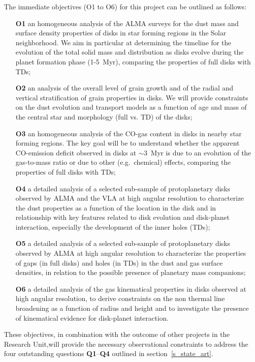 \documentclass[10pt,fleqn,twoside]{article}
\begin{document}
The immediate objectives (O1 to O6) for this project can be outlined as follows:
\begin{itemize}
\item[{\bf O1}] an homogeneous analysis of the ALMA surveys for the dust mass and surface density properties of disks in star forming regions in the Solar neighborhood. We aim in particular at determining the timeline for the evolution of the total solid mass and distribution as disks evolve during the planet formation phase (1-5~Myr), comparing the properties of full disks with TDs;
\item[{\bf O2}] an analysis of the overall level of grain growth and of the radial and vertical stratification of grain properties in disks. We will provide constraints on the dust evolution and transport models as a function of age and mass of the central star and morphology (full vs. TD) of the disks;
\item[{\bf O3}] an homogeneous analysis of the CO-gas content in disks in nearby star forming regions. The key goal will be to understand whether the apparent CO-emission deficit observed in disks at $\sim$3~Myr is due to an evolution of the gas-to-mass ratio or due to other (e.g.\ chemical) effects, comparing the properties of full disks with TDs;
\item[{\bf O4}] a detailed analysis of a selected sub-sample of protoplanetary disks observed by ALMA and the VLA at high angular resolution to characterize the dust properties as a function of the location in the disk and in relationship with key features related to disk evolution and disk-planet interaction, especially the development of the inner holes (TDs);
\item[{\bf O5}] a detailed analysis of a selected sub-sample of protoplanetary disks observed by ALMA at high angular resolution to characterize the properties of gaps (in full disks) and holes (in TDs) in the dust and gas surface densities, in relation to the possible presence of planetary mass companions;
\item[{\bf O6}] a detailed analysis of the gas kinematical properties in disks observed at high angular resolution, to derive constraints on the non thermal line broadening as a function of radius and height and to investigate the presence of kinematical evidence for disk-planet interaction. 
\end{itemize}

These objectives, in combination with the outcome of other projects in the Research Unit,will provide the necessary observational constraints to address the four outstanding questions {\bf Q1}--{\bf Q4} outlined in section~\ref{s_state_art}. 
\end{document}
